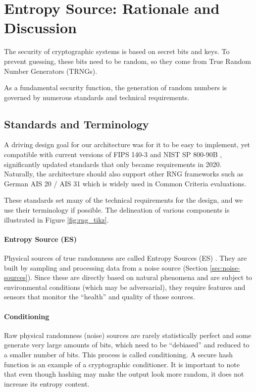 \section{Entropy Source: Rationale and Discussion}
\label{sec:entropy-appendix}

    The security of cryptographic systems is based on secret bits and keys.
    To prevent guessing, these bits need to be random, so they come from
    True Random Number Generators (TRNGs).

    As a fundamental security function, the generation of random numbers is
    governed by numerous standards and technical requirements.

\subsection{Standards and Terminology}

    A driving design goal for our architecture was for it to be easy to
    implement, yet compatible with current versions of FIPS 140-3
    \cite{NI19} and NIST SP 800-90B \cite{TuBaKe+18}, significantly
    updated standards that only became requirements in 2020. Naturally,
    the architecture should also support other RNG frameworks such as
    German AIS 20 / AIS 31 \cite{KiSc01,KiSc11,BS13} which is widely used
    in Common Criteria evaluations.

    These standards set many of the technical requirements for the design,
    and we use their terminology if possible.
    The delineation of various components is illustrated in Figure
    \ref{fig:rng_tikz}.


    \paragraph{Entropy Source (ES)}
    \label{sec:intro-es}
    Physical sources of true randomness are called Entropy Sources (ES)
    \cite{TuBaKe+18}. They are built by sampling and processing data
    from a noise source (Section \ref{sec:noise-sources}). Since these
    are directly based on natural phenomena and are subject to
    environmental conditions (which may be adversarial), they require
    features and sensors that monitor the ``health'' and quality of those
    sources.

    \paragraph{Conditioning}
    \label{sec:intro-cond}
    Raw physical randomness (noise) sources are rarely statistically
    perfect and some generate very large amounts of bits, which need to be
    ``debiased'' and reduced to a smaller number of bits. This process is
    called conditioning. A secure hash function is an example of a
    cryptographic conditioner. It is important to note that even though
    hashing may make the output look more random, it does not increase its
    entropy content.

